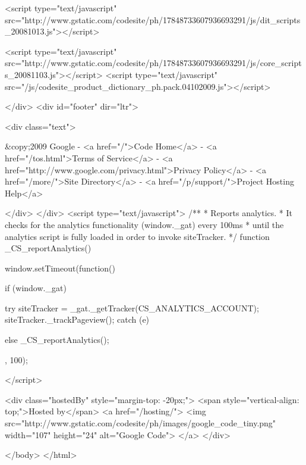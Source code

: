 <script type="text/javascript" src="http://www.gstatic.com/codesite/ph/17848733607936693291/js/dit_scripts_20081013.js"></script>

 
 <script type="text/javascript" src="http://www.gstatic.com/codesite/ph/17848733607936693291/js/core_scripts_20081103.js"></script>
 <script type="text/javascript" src="/js/codesite_product_dictionary_ph.pack.04102009.js"></script>
 
 
 
 </div>
<div id="footer" dir="ltr">
 
 <div class="text">
 
 &copy;2009 Google -
 <a href="/">Code Home</a> -
 <a href="/tos.html">Terms of Service</a> -
 <a href="http://www.google.com/privacy.html">Privacy Policy</a> -
 <a href="/more/">Site Directory</a> -
 <a href="/p/support/">Project Hosting Help</a>
 
 </div>
</div>
<script type="text/javascript">
/**
 * Reports analytics.
 * It checks for the analytics functionality (window._gat) every 100ms
 * until the analytics script is fully loaded in order to invoke siteTracker.
 */
function _CS_reportAnalytics() {
 window.setTimeout(function() {
 if (window._gat) {
 try {
 siteTracker = _gat._getTracker(CS_ANALYTICS_ACCOUNT);
 siteTracker._trackPageview();
 } catch (e) {}
 
 } else {
 _CS_reportAnalytics();
 }
 }, 100);
}
</script>

 
 
 <div class="hostedBy" style="margin-top: -20px;">
 <span style="vertical-align: top;">Hosted by</span>
 <a href="/hosting/">
 <img src="http://www.gstatic.com/codesite/ph/images/google_code_tiny.png" width="107" height="24" alt="Google Code">
 </a>
 </div>
 
 
 
 


 
 </body>
</html>


